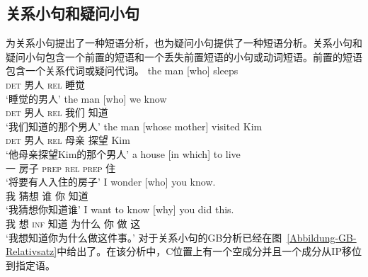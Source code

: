 \begin{exe}
\begin{xlist}[iv.]
\begin{exe}
\begin{xlist}[iv.]
\subsection{关系小句和疑问小句}
\label{Abschnitt-Relativ-Interrogativsaetze}
\mbox{}\citet{Sag97a}为关系小句提出了一种短语分析，\citet{GSag2000a-u}也为疑问小句提供了一种短语分析。关系小句和疑问小句包含一个前置的短语和一个丢失前置短语的小句或动词短语。前置的短语包含一个关系代词或疑问代词。
\eal
\ex
\gll the man [who] sleeps\\
     \textsc{det} 男人 \textsc{rel} 睡觉\\
\glt `睡觉的男人' 
\ex
\gll the man [who] we know\\
     \textsc{det} 男人 \textsc{rel} 我们 知道\\
\glt `我们知道的那个男人' 
\ex
\gll the man [whose mother] visited Kim\\
     \textsc{det} 男人 \textsc{rel} 母亲 探望 Kim\\
\glt `他母亲探望Kim的那个男人' 
\ex
\gll a house [in which] to live\\
     一 房子 \textsc{prep} \textsc{rel} \textsc{prep} 住\\
\glt `将要有人入住的房子' 
\zl
\eal
\ex
\gll I wonder [who] you know.\\
     我 猜想 谁 你 知道\\
\glt `我猜想你知道谁' 
\ex
\gll  I want to know [why] you did this.\\
     我 想 \textsc{inf} 知道 为什么 你 做 这\\
\glt `我想知道你为什么做这件事。' 
\zl
对于关系小句的GB分析已经在图~\ref{Abbildung-GB-Relativsatz}中给出了。在该分析中，C位置上有一个空成分并且一个成分从IP移位到指定语。%

\end{xlist}
\end{exe}
\end{xlist}
\end{exe}
